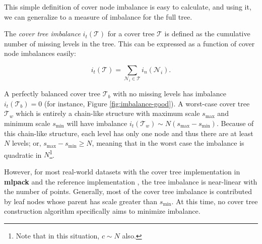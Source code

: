 This simple definition of cover node imbalance is easy to calculate, and using
it, we can generalize to a measure of imbalance for the full tree.

\begin{defn}
\label{def:imbalance}
The {\it cover tree imbalance} $i_t(\mathscr{T})$ for a cover tree $\mathscr{T}$
is defined as the cumulative number of missing levels in the tree.  This can be
expressed as a function of cover node imbalances easily:

\begin{equation}
i_t(\mathscr{T}) = \sum_{\mathscr{N}_i \in \mathscr{T}} i_n(\mathscr{N}_i).
\end{equation}
\end{defn}

A perfectly balanced cover tree $\mathscr{T}_b$ with no missing levels has
imbalance $i_t(\mathscr{T}_b) = 0$ (for instance, Figure
\ref{fig:imbalance-good}).  A worst-case cover tree $\mathscr{T}_w$ which is
entirely a chain-like structure with maximum scale $s_{\max}$ and minimum scale
$s_{\min}$ will have imbalance $i_t(\mathscr{T}_w) \sim N (s_{\max} -
s_{\min})$.  Because of this chain-like structure, each level has only one node
and thus there are at least $N$ levels; or, $s_{\max} - s_{\min} \ge N$, meaning
that in the worst case the imbalance is quadratic in $N$\footnote{Note that in
this situation, $c \sim N$ also.}.

However, for most real-world datasets with the cover tree implementation in {\bf
mlpack} \citep{mlpack2013} and the reference implementation
\citep{langford2006}, the tree imbalance is near-linear with the number of
points.  Generally, most of the cover tree imbalance is contributed by leaf
nodes whose parent has scale greater than $s_{\min}$.  At this time, no cover
tree construction algorithm specifically aims to minimize imbalance.



